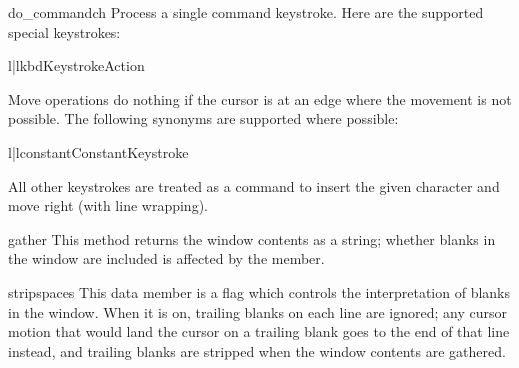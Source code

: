 \begin{methoddesc}{do_command}{ch}
Process a single command keystroke.  Here are the supported special
keystrokes: 

\begin{tableii}{l|l}{kbd}{Keystroke}{Action}
\end{tableii}

Move operations do nothing if the cursor is at an edge where the
movement is not possible.  The following synonyms are supported where
possible:

\begin{tableii}{l|l}{constant}{Constant}{Keystroke}
\end{tableii}

All other keystrokes are treated as a command to insert the given
character and move right (with line wrapping).
\end{methoddesc}

\begin{methoddesc}{gather}{}
This method returns the window contents as a string; whether blanks in
the window are included is affected by the 
member.
\end{methoddesc}

\begin{memberdesc}{stripspaces}
This data member is a flag which controls the interpretation of blanks in
the window.  When it is on, trailing blanks on each line are ignored;
any cursor motion that would land the cursor on a trailing blank goes
to the end of that line instead, and trailing blanks are stripped when
the window contents are gathered.
\end{memberdesc}


